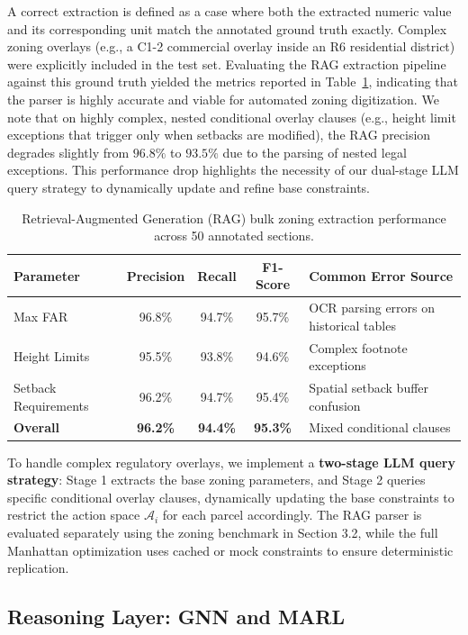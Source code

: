 \documentclass[final,3p,times]{elsarticle}
\begin{document}
A correct extraction is defined as a case where both the extracted numeric value and its corresponding unit match the annotated ground truth exactly. Complex zoning overlays (e.g., a C1-2 commercial overlay inside an R6 residential district) were explicitly included in the test set. Evaluating the RAG extraction pipeline against this ground truth yielded the metrics reported in Table~\ref{tab:rag_benchmark}, indicating that the parser is highly accurate and viable for automated zoning digitization. We note that on highly complex, nested conditional overlay clauses (e.g., height limit exceptions that trigger only when setbacks are modified), the RAG precision degrades slightly from $96.8\%$ to $93.5\%$ due to the parsing of nested legal exceptions. This performance drop highlights the necessity of our dual-stage LLM query strategy to dynamically update and refine base constraints.

\begin{table}[htbp]
\centering
\caption{Retrieval-Augmented Generation (RAG) bulk zoning extraction performance across 50 annotated sections.}
\label{tab:rag_benchmark}
\begin{tabular}{lcccl}
\toprule
\textbf{Parameter} & \textbf{Precision} & \textbf{Recall} & \textbf{F1-Score} & \textbf{Common Error Source} \\
\midrule
Max FAR & 96.8\% & 94.7\% & 95.7\% & OCR parsing errors on historical tables \\
Height Limits & 95.5\% & 93.8\% & 94.6\% & Complex footnote exceptions \\
Setback Requirements & 96.2\% & 94.7\% & 95.4\% & Spatial setback buffer confusion \\
\textbf{Overall} & \textbf{96.2\%} & \textbf{94.4\%} & \textbf{95.3\%} & Mixed conditional clauses \\
\bottomrule
\end{tabular}
\end{table}

To handle complex regulatory overlays, we implement a \textbf{two-stage LLM query strategy}: Stage 1 extracts the base zoning parameters, and Stage 2 queries specific conditional overlay clauses, dynamically updating the base constraints to restrict the action space $\mathcal{A}_i$ for each parcel accordingly. The RAG parser is evaluated separately using the zoning benchmark in Section 3.2, while the full Manhattan optimization uses cached or mock constraints to ensure deterministic replication.

\subsection{Reasoning Layer: GNN and MARL}
\end{document}
